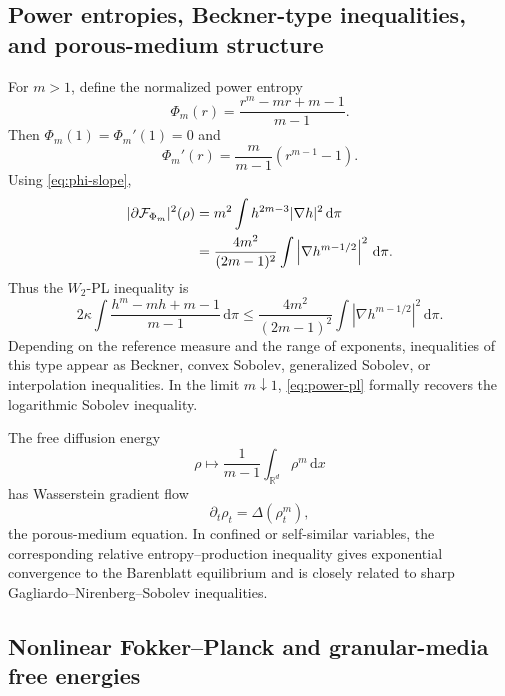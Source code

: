 \documentclass[11pt]{article}
\theoremstyle{definition}
\newcommand{\F}{\mathcal F}
\newcommand{\W}{W_2}
\newcommand{\R}{\mathbb R}
\newcommand{\dd}{\,\mathrm d}
\begin{document}
\subsection{Power entropies, Beckner-type inequalities, and porous-medium structure}

For $m>1$, define the normalized power entropy
\begin{equation}
        \Phi_m(r)=\frac{r^m-mr+m-1}{m-1}.
        \label{eq:power-phi}
\end{equation}
Then $\Phi_m(1)=\Phi_m'(1)=0$ and
\[
        \Phi_m'(r)=\frac{m}{m-1}(r^{m-1}-1).
\]
Using \eqref{eq:phi-slope},
\begin{align}
        |\partial\F_{\Phi_m}|^2(\rho)
        &=m^2\int h^{2m-3}|\nabla h|^2\dd\pi \notag\\
        &=\frac{4m^2}{(2m-1)^2}
          \int \left|\nabla h^{m-1/2}\right|^2\dd\pi.
        \label{eq:power-slope}
\end{align}
Thus the $\W$-PL inequality is
\begin{equation}
        2\kappa\int \frac{h^m-mh+m-1}{m-1}\dd\pi
        \le
        \frac{4m^2}{(2m-1)^2}
        \int \left|\nabla h^{m-1/2}\right|^2\dd\pi.
        \label{eq:power-pl}
\end{equation}
Depending on the reference measure and the range of exponents, inequalities of this type appear as Beckner, convex Sobolev, generalized Sobolev, or interpolation inequalities. In the limit $m\downarrow1$, \eqref{eq:power-pl} formally recovers the logarithmic Sobolev inequality.

The free diffusion energy
\[
        \rho\mapsto \frac{1}{m-1}\int_{\R^d}\rho^m\dd x
\]
has Wasserstein gradient flow
\[
        \partial_t\rho_t=\Delta(\rho_t^m),
\]
the porous-medium equation. In confined or self-similar variables, the corresponding relative entropy--production inequality gives exponential convergence to the Barenblatt equilibrium and is closely related to sharp Gagliardo--Nirenberg--Sobolev inequalities.

\subsection{Nonlinear Fokker--Planck and granular-media free energies}
\end{document}
